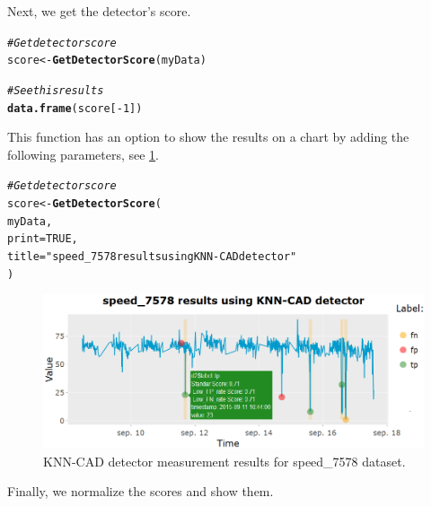 \documentclass[a4paper]{article}\usepackage[]{graphicx}\usepackage[]{color}
\makeatletter
\newcommand{\hlnum}[1]{\textcolor[rgb]{0.686,0.059,0.569}{#1}}%
\newcommand{\hlstr}[1]{\textcolor[rgb]{0.192,0.494,0.8}{#1}}%
\newcommand{\hlcom}[1]{\textcolor[rgb]{0.678,0.584,0.686}{\textit{#1}}}%
\newcommand{\hlopt}[1]{\textcolor[rgb]{0,0,0}{#1}}%
\newcommand{\hlstd}[1]{\textcolor[rgb]{0.345,0.345,0.345}{#1}}%
\newcommand{\hlkwb}[1]{\textcolor[rgb]{0.69,0.353,0.396}{#1}}%
\newcommand{\hlkwc}[1]{\textcolor[rgb]{0.333,0.667,0.333}{#1}}%
\newcommand{\hlkwd}[1]{\textcolor[rgb]{0.737,0.353,0.396}{\textbf{#1}}}%
\newenvironment{kframe}{%
 \def\at@end@of@kframe{}%
 \ifinner\ifhmode%
  \def\at@end@of@kframe{\end{minipage}}%
  \begin{minipage}{\columnwidth}%
 \fi\fi%
 \def\FrameCommand##1{\hskip\@totalleftmargin \hskip-\fboxsep
 \colorbox{shadecolor}{##1}\hskip-\fboxsep
     \hskip-\linewidth \hskip-\@totalleftmargin \hskip\columnwidth}%
 \MakeFramed {\advance\hsize-\width
   \@totalleftmargin\z@ \linewidth\hsize
   \@setminipage}}%
 {\par\unskip\endMakeFramed%
 \at@end@of@kframe}
\newenvironment{knitrout}{}{} %
\makeatother
\begin{document}
Next, we get the detector's score.

\begin{knitrout}
\color{fgcolor}\begin{kframe}
\begin{alltt}
\hlcom{# Get detector score}
\hlstd{score} \hlkwb{<-} \hlkwd{GetDetectorScore}\hlstd{(myData)}

\hlcom{# See this results}
\hlkwd{data.frame}\hlstd{(score[}\hlopt{-}\hlnum{1}\hlstd{])}
\end{alltt}
\end{kframe}
\end{knitrout}

This function has an option to show the results on a chart by adding the following parameters, see \ref{fig:Ej1ScoreDe}.

\begin{knitrout}
\color{fgcolor}\begin{kframe}
\begin{alltt}
\hlcom{# Get detector score}
\hlstd{score} \hlkwb{<-} \hlkwd{GetDetectorScore}\hlstd{(}
  \hlstd{myData,}
  \hlkwc{print} \hlstd{=} \hlnum{TRUE}\hlstd{,}
  \hlkwc{title} \hlstd{=} \hlstr{"speed_7578 results using KNN-CAD detector"}
\hlstd{)}
\end{alltt}
\end{kframe}
\end{knitrout}

\begin{figure}[htbp]
\centering
\includegraphics[width=1\linewidth]{Ej1ScoreDe.PNG}
\caption{KNN-CAD detector measurement results for speed\_7578 dataset.}
\label{fig:Ej1ScoreDe}
\end{figure}

Finally, we normalize the scores and show them.
\end{document}
